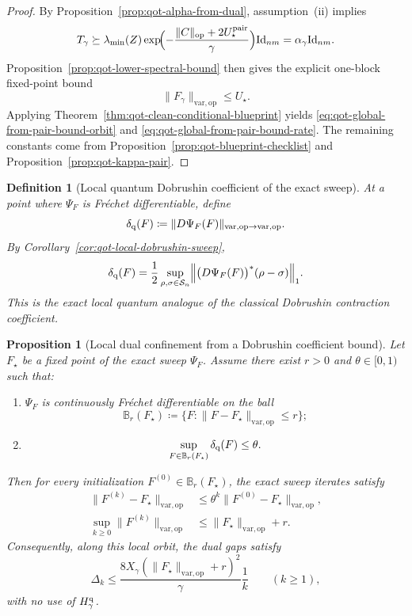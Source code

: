 \documentclass[11pt]{article}
\newcommand{\Id}{\mathrm{Id}}
\newcommand{\eqdef}{\coloneqq}
\newcommand{\Ss}{\mathcal{S}}
\newcommand{\op}{\mathrm{op}}
\newcommand{\varop}{\mathrm{var},\op}
\theoremstyle{plain}
\newtheorem{definition}{Definition}[section]
\newtheorem{proposition}{Proposition}[section]
\begin{document}
\begin{proof}
By Proposition~\ref{prop:qot-alpha-from-dual}, assumption~(ii) implies
\[
T_\gamma
\succeq
\lambda_{\min}(Z)\exp\!\Bigl(-\frac{\|C\|_{\op}+2U_\star^{\rm pair}}{\gamma}\Bigr)\Id_{nm}
=
\alpha_\gamma \Id_{nm}.
\]
Proposition~\ref{prop:qot-lower-spectral-bound} then gives the explicit one-block fixed-point bound
\[
\|F_\gamma\|_{\varop}\le U_\star.
\]
Applying Theorem~\ref{thm:qot-clean-conditional-blueprint} yields
\eqref{eq:qot-global-from-pair-bound-orbit} and \eqref{eq:qot-global-from-pair-bound-rate}.
The remaining constants come from Proposition~\ref{prop:qot-blueprint-checklist} and Proposition~\ref{prop:qot-kappa-pair}.
\end{proof}

\begin{definition}[Local quantum Dobrushin coefficient of the exact sweep]
\label{def:qot-local-dobrushin}
At a point where $\Psi_F$ is Fr\'echet differentiable, define
\[
\delta_{\rm q}(F)
\eqdef
\|D\Psi_F(F)\|_{\varop\to\varop}.
\]
By Corollary~\ref{cor:qot-local-dobrushin-sweep},
\[
\delta_{\rm q}(F)
=
\frac12\sup_{\rho,\sigma\in \Ss_n}
\Bigl\|
\bigl(D\Psi_F(F)\bigr)^\ast(\rho-\sigma)
\Bigr\|_1.
\]
This is the exact local quantum analogue of the classical Dobrushin contraction coefficient.
\end{definition}

\begin{proposition}[Local dual confinement from a Dobrushin coefficient bound]
\label{prop:qot-local-confinement-no-H}
Let $F_\star$ be a fixed point of the exact sweep $\Psi_F$.
Assume there exist $r>0$ and $\theta\in[0,1)$ such that:
\begin{enumerate}[label=\textnormal{(\roman*)}]
\item $\Psi_F$ is continuously Fr\'echet differentiable on the ball
\[
\mathbb B_r(F_\star)
\eqdef
\{F : \|F-F_\star\|_{\varop}\le r\};
\]
\item
\[
\sup_{F\in \mathbb B_r(F_\star)} \delta_{\rm q}(F)\le \theta.
\]
\end{enumerate}
Then for every initialization $F^{(0)}\in \mathbb B_r(F_\star)$, the exact sweep iterates satisfy
\begin{align}
\|F^{(k)}-F_\star\|_{\varop}
&\le
\theta^k \|F^{(0)}-F_\star\|_{\varop},
\label{eq:qot-local-linear-conv}\\
\sup_{k\ge 0}\|F^{(k)}\|_{\varop}
&\le
\|F_\star\|_{\varop}+r.
\label{eq:qot-local-dual-bound}
\end{align}
Consequently, along this local orbit, the dual gaps satisfy
\begin{equation}
\label{eq:qot-local-rate-no-H}
\Delta_k
\le
\frac{8X_\gamma(\|F_\star\|_{\varop}+r)^2}{\gamma}\frac{1}{k}
\qquad (k\ge 1),
\end{equation}
with no use of $H_\gamma^{\rm q}$.
\end{proposition}
\end{document}
